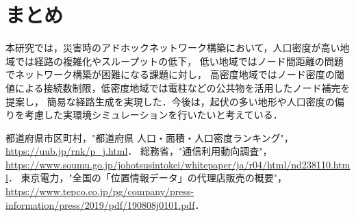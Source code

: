\documentclass[a4paper, 9pt]{ltjsarticle}
\begin{document}
\section{まとめ} \label{label:conclusion}
本研究では，災害時のアドホックネットワーク構築において，人口密度が高い地域では経路の複雑化やスループットの低下，
低い地域ではノード間距離の問題でネットワーク構築が困難になる課題に対し，
高密度地域ではノード密度の閾値による接続数制限，低密度地域では電柱などの公共物を活用したノード補完を提案し，
簡易な経路生成を実現した．今後は，起伏の多い地形や人口密度の偏りを考慮した実環境シミュレーションを行いたいと考えている．

\begin{thebibliography}{9}
   都道府県市区町村，"都道府県 人口・面積・人口密度ランキング"，\url{https://uub.jp/rnk/p\_j.html}．
   総務省，"通信利用動向調査"，\url{https://www.soumu.go.jp/johotsusintokei/whitepaper/ja/r04/html/nd238110.html}．
   東京電力，"全国の「位置情報データ」の代理店販売の概要"，\url{https://www.tepco.co.jp/pg/company/press-information/press/2019/pdf/190808j0101.pdf}．
\end{thebibliography}
\end{document}

